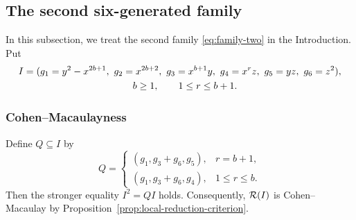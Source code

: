 \subsection{The second six-generated family}
\label{sec:family-two}

In this subsection, we treat the second family \eqref{eq:family-two} in the
Introduction.  Put
$$
\begin{aligned}
 I={}&(g_1=y^2-x^{2b+1},\ g_2=x^{2b+2},\ g_3=x^{b+1}y,\
        g_4=x^rz,\ g_5=yz,\ g_6=z^2),\\
 &\hspace{35mm} b\geq1,\qquad 1\leq r\leq b+1.
\end{aligned}
$$

\subsubsection{Cohen--Macaulayness}

\begin{proposition}
\label{prop:family-two-reductions}
Define $Q\subseteq I$ by
$$
 Q=
 \begin{cases}
  (g_1,g_3+g_6,g_5),&r=b+1,\\
  (g_1,g_3+g_6,g_4),&1\leq r\leq b.
 \end{cases}
$$
Then the stronger equality $I^2=QI$ holds.  Consequently, $\mathcal R(I)$ is Cohen--Macaulay by
Proposition~\ref{prop:local-reduction-criterion}.
\end{proposition}

